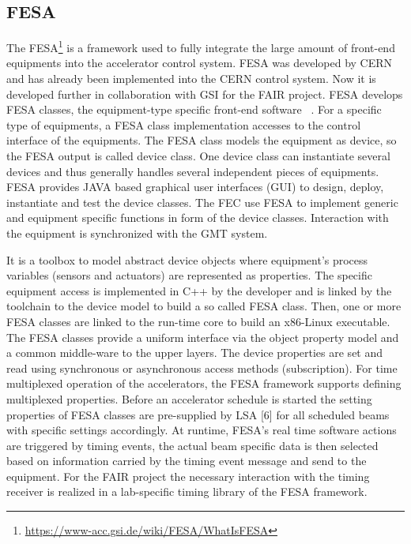 \subsection{FESA}
The \gls{FESA}\footnote{\url{https://www-acc.gsi.de/wiki/FESA/WhatIsFESA}} is a framework used to fully integrate the large amount of front-end equipments into the accelerator control system. FESA was developed by CERN and has already been implemented into the \gls{CERN} control system. Now it is developed further in collaboration with GSI for the FAIR project. FESA develops FESA classes, the equipment-type specific front-end software ~\cite{hoffmann_fesafront-end_2008}. For a specific type of equipments, a FESA class implementation accesses to the control interface of the equipments. The FESA class models the equipment as device, so the FESA output is called device class. One device class can instantiate several devices and thus generally handles several independent pieces of equipments.  FESA provides JAVA based graphical user interfaces (GUI) to design, deploy, instantiate and test the device classes. The FEC use FESA to implement generic and equipment specific functions in form of the device classes. Interaction with the equipment is synchronized with the GMT system. 

 It is a toolbox to model abstract device objects where equipment’s process variables (sensors and actuators) are represented as properties. The specific equipment access is implemented in C++ by the developer and is linked by the toolchain
to the device model to build a so called FESA class. Then, one or more FESA classes are linked to the run-time core to build an x86-Linux executable. The
FESA classes provide a uniform interface via the object property model and a common middle-ware to the upper layers. The device properties are set and read using synchronous or asynchronous access methods (subscription). For time multiplexed operation of the accelerators, the FESA framework supports defining multiplexed properties. Before an accelerator schedule is started the setting properties of FESA classes are pre-supplied by LSA [6] for all scheduled beams with specific settings accordingly. At runtime, FESA’s real time software actions are triggered by timing events, the actual beam specific data is then selected based on information carried by the timing event message and send to the equipment. For the FAIR project the necessary interaction with the timing receiver is realized in a
lab-specific timing library of the FESA framework.


